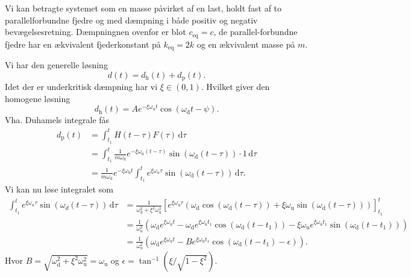 \begin{derivation}
  Vi kan betragte systemet som en masse påvirket af en last, holdt fast af to parallelforbundne fjedre og med dæmpning i både positiv og negativ bevægelsesretning.
  Dæmpningnen ovenfor er blot $c_{\mathrm{eq}} = c$, de parallel-forbundne fjedre har en ækvivalent fjederkonstant på $k_{\mathrm{eq}} = 2k$ og en ækvivalent masse på $m$.

  Vi har den generelle løsning
  \[ 
  d(t) = d_{\mathrm{h}}(t) + d_{\mathrm{p}}(t)
  .\]
  Idet der er underkritisk dæmpning har vi $\xi \in (0,1)$.
  Hvilket giver den homogene løsning
  \[ 
  d_{\mathrm{h}}(t) = A e^{- \xi \omega_{\mathrm{u}} t} \cos \left( \omega_{\mathrm{d}} t - \psi \right)
  .\]
  Vha. Duhamels integrale fås
  \begin{align*}
    d_{\mathrm{p}}(t) &= \int_{t_1}^{t} H(t - \tau) F(\tau) \, \mathrm{d}\tau \\
            &= \int_{t_1}^{t} \frac{1}{m \omega_{\mathrm{d}}} e^{-\xi \omega_{\mathrm{u}} \left( t - \tau \right)} \sin \left( \omega_{\mathrm{d}} \left( t - \tau \right) \right) \cdot 1 \, \mathrm{d}\tau \\
            &= \frac{1}{m \omega_{\mathrm{d}}} e^{- \xi \omega_{\mathrm{u}} t} \int_{t_1}^{t} e^{\xi \omega_u \tau} \sin \left( \omega_{\mathrm{d}} \left( t - \tau \right) \right) \, \mathrm{d}\tau
  .\end{align*}
  Vi kan nu løse integralet som
  \begin{align*}
    \int_{t_1}^{t} e^{\xi \omega_u \tau} \sin \left( \omega_d \left( t - \tau \right) \right) \, \mathrm{d}\tau &= \frac{1}{\omega_{\mathrm{d}}^2 + \xi^2 \omega_{\mathrm{u}}^2} \left[ e^{\xi \omega_{\mathrm{u}} \tau} \left( \omega_{\mathrm{d}} \cos \left( \omega_{\mathrm{d}} \left( t - \tau \right) \right) + \xi \omega_{\mathrm{u}} \sin \left( \omega_{\mathrm{d}} \left( t - \tau \right) \right) \right) \right]_{t_1}^{t} \\
   &= \frac{1}{\omega_{\mathrm{u}}^2} \left( \omega_{\mathrm{d}} e^{\xi \omega_{\mathrm{u}} t} - \omega_{\mathrm{d}} e^{\xi \omega_{\mathrm{u}} t_1} \cos \left( \omega_{\mathrm{d}} \left( t - t_1 \right) \right) - \xi \omega_{\mathrm{u}} e^{\xi \omega_{\mathrm{u}} t_1} \sin \left( \omega_{\mathrm{d}} \left( t - t_1 \right) \right) \right) \\
  &= \frac{1}{\omega_{\mathrm{u}}^2} \left( \omega_{\mathrm{d}} e^{\xi \omega_{\mathrm{u}} t} - B e^{\xi \omega_{\mathrm{u}} t_1} \cos \left( \omega_{\mathrm{d}} \left( t - t_1 \right) - \epsilon \right) \right)
  .\end{align*}
  Hvor $B = \sqrt{\omega_{\mathrm{d}}^2 + \xi^2 \omega_{\mathrm{u}}^2} = \omega_{\mathrm{u}}$ og $\epsilon = \tan^{-1} \left( \xi / \sqrt{1 - \xi^2} \right)$.


\end{derivation}
